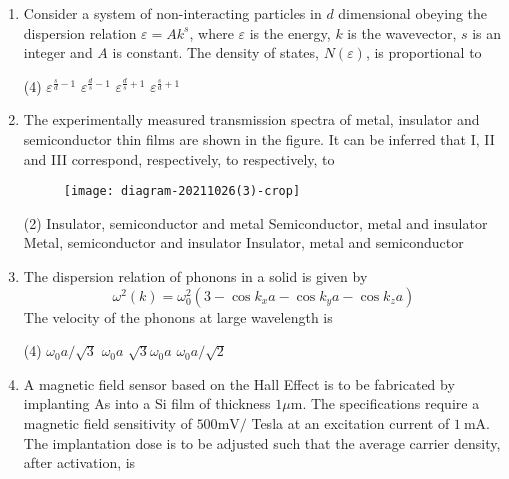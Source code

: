 \begin{enumerate}
	{}
\begin{tasks}(4)
\task[\textbf{A.}]  $T^{1 / 2}$
\task[\textbf{B.}] $T$
\task[\textbf{C.}] $T^{3 / 2}$
\task[\textbf{D.}] $T^{3}$
\end{tasks}
	\item Consider a system of non-interacting particles in $d$ dimensional obeying the dispersion relation $\varepsilon=A k^{s}$, where $\varepsilon$ is the energy, $k$ is the wavevector, $s$ is an integer and $A$ is constant. The density of states, $N(\varepsilon)$, is proportional to
	{}
\begin{tasks}(4)
\task[\textbf{A.}] $\varepsilon^{\frac{s}{d}-1}$
\task[\textbf{B.}] $\varepsilon^{\frac{d}{s}-1}$
\task[\textbf{C.}] $\varepsilon^{\frac{d}{s}+1}$
\task[\textbf{D.}] $\varepsilon^{\frac{s}{d}+1}$
\end{tasks}
	\item The experimentally measured transmission spectra of metal, insulator and semiconductor thin films are shown in the figure. It can be inferred that I, II and III correspond, respectively, to
	respectively, to
	{}
\begin{figure}[H]
\centering
\texttt{[image: diagram-20211026(3)-crop]}
\end{figure}
\begin{tasks}(2)
\task[\textbf{A.}]  Insulator, semiconductor and metal
\task[\textbf{B.}]  Semiconductor, metal and insulator
\task[\textbf{C.}] Metal, semiconductor and insulator
\task[\textbf{D.}] Insulator, metal and semiconductor
\end{tasks}
	\item The dispersion relation of phonons in a solid is given by
	$$
	\omega^{2}(k)=\omega_{0}^{2}\left(3-\cos k_{x} a-\cos k_{y} a-\cos k_{z} a\right)
	$$
	The velocity of the phonons at large wavelength is
	{}
\begin{tasks}(4)
\task[\textbf{A.}] $\omega_{0} a / \sqrt{3}$
\task[\textbf{B.}] $\omega_{0} a$
\task[\textbf{C.}] $\sqrt{3} \omega_{0} a$
\task[\textbf{D.}] $\omega_{0} a / \sqrt{2}$
\end{tasks}
	\item A magnetic field sensor based on the Hall Effect is to be fabricated by implanting As into a Si film of thickness $1 \mu \mathrm{m}$. The specifications require a magnetic field sensitivity of $500 \mathrm{mV} /$ Tesla at an excitation current of $1 \mathrm{~mA}$. The implantation dose is to be adjusted such that the average carrier density, after activation, is

\end{enumerate}
